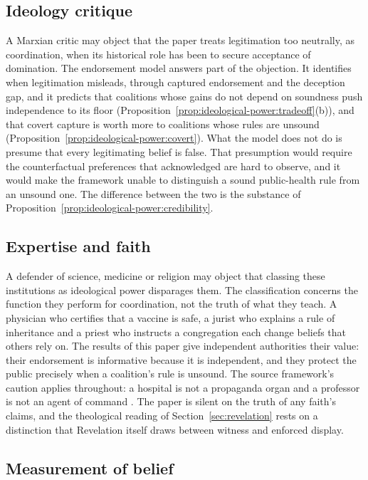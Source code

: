 \documentclass[11pt,letterpaper]{article}
\theoremstyle{definition}
\theoremstyle{remark}
\begin{document}
\subsection{Ideology critique}

A Marxian critic may object that the paper treats legitimation too neutrally, as coordination, when its historical role has been to secure acceptance of domination. The endorsement model answers part of the objection. It identifies when legitimation misleads, through captured endorsement and the deception gap, and it predicts that coalitions whose gains do not depend on soundness push independence to its floor (Proposition~\ref{prop:ideological-power:tradeoff}(b)), and that covert capture is worth more to coalitions whose rules are unsound (Proposition~\ref{prop:ideological-power:covert}). What the model does not do is presume that every legitimating belief is false. That presumption would require the counterfactual preferences that \citet{lukes2005} acknowledged are hard to observe, and it would make the framework unable to distinguish a sound public-health rule from an unsound one. The difference between the two is the substance of Proposition~\ref{prop:ideological-power:credibility}.

\subsection{Expertise and faith}

A defender of science, medicine or religion may object that classing these institutions as ideological power disparages them. The classification concerns the function they perform for coordination, not the truth of what they teach. A physician who certifies that a vaccine is safe, a jurist who explains a rule of inheritance and a priest who instructs a congregation each change beliefs that others rely on. The results of this paper give independent authorities their value: their endorsement is informative because it is independent, and they protect the public precisely when a coalition's rule is unsound. The source framework's caution applies throughout: a hospital is not a propaganda organ and a professor is not an agent of command \citep{largo2026hbs}. The paper is silent on the truth of any faith's claims, and the theological reading of Section~\ref{sec:revelation} rests on a distinction that Revelation itself draws between witness and enforced display.

\subsection{Measurement of belief}
\end{document}
